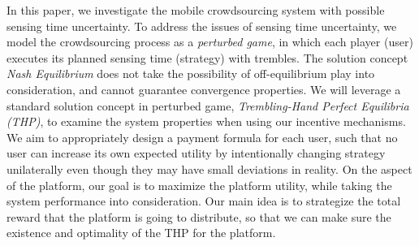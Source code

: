 \documentclass{IEEEtran}
\begin{document}

In this paper, we investigate the mobile crowdsourcing system with possible sensing {\color{black}time} uncertainty. 
To address the issues of sensing {\color{black}time} uncertainty, we model the crowdsourcing process as a \emph{perturbed game}, in which each player (user) executes its planned sensing time (strategy) with trembles. %
The solution concept \textit{Nash Equilibrium} does not take the possibility of off-equilibrium play into consideration, and cannot guarantee convergence properties. 
We will leverage a standard solution concept in perturbed game, \emph{Trembling-Hand Perfect Equilibria (THP)}, to examine the system properties when using our incentive mechanisms. 
We aim to appropriately design a payment formula for each user, such that no user can increase its own expected utility by intentionally changing strategy unilaterally even though they may have small deviations in reality. On the aspect of the platform, our goal is to maximize the platform utility, while taking the system performance into consideration. Our main idea is to strategize the total reward that the platform is going to distribute, so that we can make sure the existence and optimality of the THP for the platform.
\end{document}

